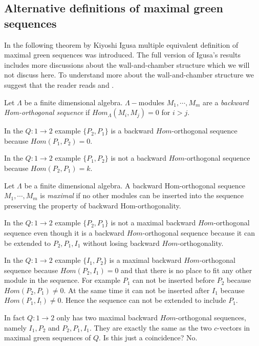 \subsection{Alternative definitions of maximal green sequences}
\indent In the following theorem by Kiyoshi Igusa multiple equivalent definition of maximal green sequences was introduced. The full version of Igusa's results includes more discussions about the wall-and-chamber structure which we will not discuss here. To understand more about the wall-and-chamber structure we suggest that the reader reads \cite{GHKK14}\cite{Mul15}\cite{BST17}\cite{BST18A}\cite{BST18B} and \cite{IOTW15}.
\begin{definition}
Let $\Lambda$ be a finite dimensional algebra. $\Lambda-$modules $M_1,\cdots,M_m$ are a \textit{backward Hom-orthogonal sequence} if $Hom_\Lambda(M_i,M_j)=0$ for $i>j$.
\end{definition}
\begin{example}
In the $Q:1\to 2$ example $\{P_2, P_1\}$ is a backward $Hom$-orthogonal sequence because $Hom(P_1, P_2) = 0$.
\end{example}
\begin{example}
In the $Q:1\to 2$ example $\{P_1, P_2\}$ is not a backward $Hom$-orthogonal sequence because $Hom(P_2, P_1) = k$.
\end{example}
\begin{definition}
Let $\Lambda$ be a finite dimensional algebra. A backward Hom-orthogonal sequence $M_1,\cdots,M_m$ is \textit{maximal} if no other modules can be inserted into the sequence preserving the property of backward Hom-orthogonality.
\end{definition}
\begin{example}
In the $Q:1\to 2$ example $\{P_2, P_1\}$ is not a maximal backward $Hom$-orthogonal sequence even though it is a backward $Hom$-orthogonal sequence because it can be extended to $P_2, P_1, I_1$ without losing backward $Hom$-orthogonality.
\end{example}
\begin{example}
In the $Q:1\to 2$ example $\{I_1, P_2\}$ is a maximal backward $Hom$-orthogonal sequence because $Hom(P_2, I_1) = 0$ and that there is no place to fit any other module in the sequence. For example $P_1$ can not be inserted before $P_2$ because $Hom(P_2, P_1)\neq 0$. At the same time it can not be inserted after $I_1$ because $Hom(P_1, I_!)\neq 0$. Hence the sequence can not be extended to include $P_1$.
\end{example}
\indent In fact $Q:1\to 2$ only has two maximal backward $Hom$-orthogonal sequences, namely $I_1,P_2$ and $P_2, P_1, I_1$. They are exactly the same as the two $c$-vectors in maximal green sequences of $Q$. Is this just a coincidence? No.
